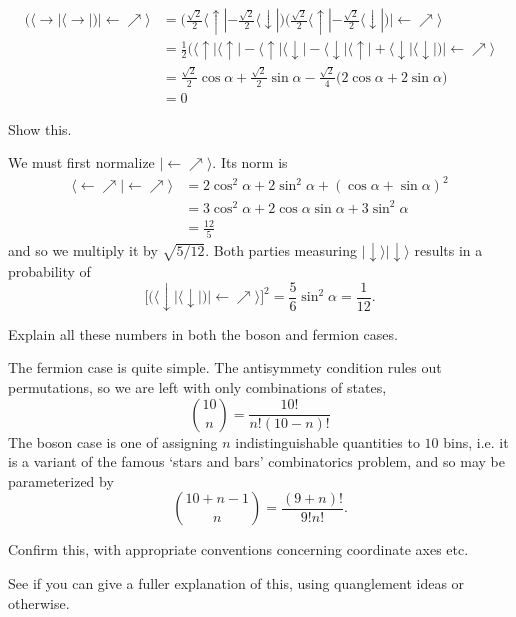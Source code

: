 \documentclass[../road-to-reality.tex]{subfiles}
\begin{document}
\begin{questions}
\begin{solution}
\begin{align*}
				\Big(\langle\rightarrow\!|\langle\rightarrow\!|\Big) |\!\leftarrow\nearrow\rangle &= \Big(\frac{\sqrt{2}}{2}\langle\uparrow\!| - \frac{\sqrt{2}}{2}\langle\downarrow\!|\Big)\Big(\frac{\sqrt{2}}{2}\langle\uparrow\!| - \frac{\sqrt{2}}{2}\langle\downarrow\!|\Big)|\!\leftarrow\nearrow\rangle \\
				&= \frac{1}{2}\Big(\langle\uparrow\!|\langle\uparrow\!| - \langle\uparrow\!|\langle\downarrow\!| - \langle\downarrow\!|\langle\uparrow\!| + \langle\downarrow\!|\langle\downarrow\!|\Big)|\!\leftarrow\nearrow\rangle \\
				&= \frac{\sqrt{2}}{2}\cos\alpha + \frac{\sqrt{2}}{2}\sin\alpha - \frac{\sqrt{2}}{4}\Big(2\cos\alpha + 2\sin\alpha\Big) \\
				&= 0
			\end{align*}
		\end{solution}
	
		\question Show this.
		
		\begin{solution}
			We must first normalize $|\!\leftarrow\nearrow\rangle$. Its norm is
			\begin{align*}
				\langle\leftarrow\nearrow\!|\!\leftarrow\nearrow\rangle &= 2\cos^2\alpha + 2\sin^2\alpha + (\cos\alpha+ \sin\alpha)^2 \\
				&= 3\cos^2\alpha + 2\cos\alpha\sin\alpha + 3\sin^2\alpha \\
				&= \frac{12}{5}
			\end{align*}
			and so we multiply it by $\sqrt{5/12}$. Both parties measuring $|\!\downarrow\rangle|\!\downarrow\rangle$ results in a probability of
			\[
				\Big[\Big(\langle\downarrow\!|\langle\downarrow\!|\Big)|\!\leftarrow\nearrow\rangle\Big]^2 = \frac{5}{6}\sin^2\alpha = \frac{1}{12}.
			\]
		\end{solution}
	
		\question Explain all these numbers in both the boson and fermion cases.
		
		\begin{solution}
			The fermion case is quite simple. The antisymmety condition rules out permutations, so we are left with only combinations of states,
			\[
				{{10}\choose{n}} = \frac{10!}{n!(10-n)!}
			\]
			The boson case is one of assigning $n$ indistinguishable quantities to $10$ bins, i.e. it is a variant of the famous `stars and bars' combinatorics problem, and so may be parameterized by
			\[
				{{10+n-1}\choose{n}} = \frac{(9 + n)!}{9!n!}.
			\]
		\end{solution}
	
	\question Confirm this, with appropriate conventions concerning coordinate axes etc.
	
	\question See if you can give a fuller explanation of this, using quanglement ideas or otherwise.
	
	\end{questions}
\end{document}
